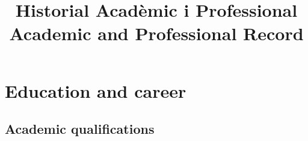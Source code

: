 \documentclass[11pt]{article}
\title{\textbf{Historial Acad\`emic i Professional}\\[2pt]\large Academic and Professional Record}
\author{\Large \CandName}
\date{}
\begin{document}
\maketitle
\thispagestyle{plain}
\vspace{0.5cm}
\begin{center}\postdata\end{center}



\newpage
\tableofcontents
\newpage

\section{Education and career}

\subsection{Academic qualifications}
\end{document}
